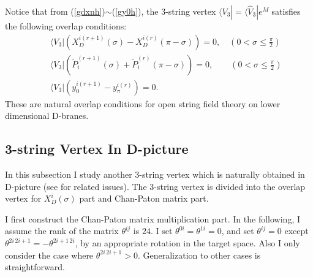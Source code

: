 \documentclass[a4paper,12pt]{article}
\newcommand{\nn}{\nonumber\\}
\def\bra{\langle}
\newcommand{\XD}{X_D}
\begin{document}
Notice that from 
(\ref{gdxnh})$\sim$(\ref{gy0h}), 
the 3-string vertex
$\bra V_3 | = \bra \hat{V}_3 |e^M$ satisfies
the following overlap conditions:
\begin{eqnarray} 
 \label{Doverlap}
&&\bra {V}_3 | 
\left(
\XD^{i(r+1)}(\sigma) - \XD^{i(r)}(\pi-\sigma)
\right)
=0, \quad (0 < \sigma \le \frac{\pi}{2}) \nn
&& \bra {V}_3 | 
\left(
\tilde{P}^{(r+1)}_i (\sigma) + \tilde{P}^{(r)}_i(\pi-\sigma)
\right)
=0, \qquad (0 < \sigma \le \frac{\pi}{2}) \nn
&& \bra {V}_3 | 
\left(y_0^{i(r+1)} - y_\pi^{i(r)} \right) = 0 .
\end{eqnarray}
These are natural overlap conditions for
open string field theory on lower dimensional
D-branes.


\subsection{3-string Vertex %
In D-picture}

In this subsection I study
another 3-string vertex which is 
naturally obtained in D-picture
(see \cite{Klu} for related issues).
The 3-string vertex is divided into
the overlap vertex
for $\XD^i(\sigma)$ part 
and Chan-Paton matrix part.

I first construct the
Chan-Paton matrix multiplication part.
In the following, I assume the rank of
the matrix $\theta^{ij}$ is $24$. 
I set $\theta^{0i}=\theta^{1i}=0$,
and set $\theta^{ij}=0$ except
$\theta^{2i\, 2i+1} =-\theta^{2i+1\, 2i}$,
by an appropriate rotation in the target space.
Also I only consider the case where
$\theta^{2i\, 2i+1} > 0$.
Generalization to other
cases is straightforward.
\end{document}
